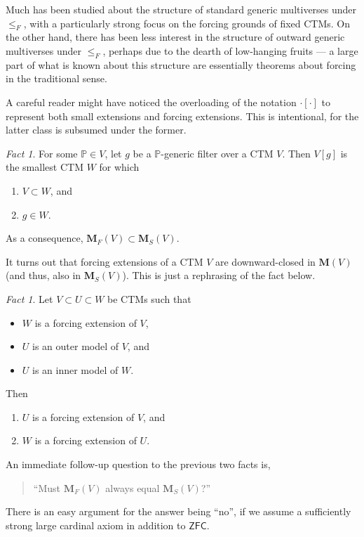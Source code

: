 \documentclass[12pt, twoside]{memoir}
\numberwithin{equation}{section}
\theoremstyle{definition}
\theoremstyle{remark}
\newtheorem{fact}[thm]{Fact}
\theoremstyle{definition}
\theoremstyle{definition}
\theoremstyle{definition}
\theoremstyle{remark}
\begin{document}
Much has been studied about the structure of standard generic multiverses under $\leq_F$, with a particularly strong focus on the forcing grounds of fixed CTMs. On the other hand, there has been less interest in the structure of outward generic multiverses under $\leq_F$, perhaps due to the dearth of low-hanging fruits --- a large part of what is known about this structure are essentially theorems about forcing in the traditional sense.

A careful reader might have noticed the overloading of the notation $\cdot [\cdot]$ to represent both small extensions and forcing extensions. This is intentional, for the latter class is subsumed under the former.

\begin{fact}
For some $\mathbb{P} \in V$, let $g$ be a $\mathbb{P}$-generic filter over a CTM $V$. Then $V[g]$ is the smallest CTM $W$ for which
\begin{enumerate}[label=(\alph*)]
    \item $V \subset W$, and
    \item $g \in W$.
\end{enumerate}
As a consequence, $\mathbf{M}_F(V) \subset \mathbf{M}_S(V)$.
\end{fact}

It turns out that forcing extensions of a CTM $V$ are downward-closed in $\mathbf{M}(V)$ (and thus, also in $\mathbf{M}_S(V)$). This is just a rephrasing of the fact below.

\begin{fact}\label{fact221}
Let $V \subset U \subset W$ be CTMs such that
\begin{itemize}
    \item $W$ is a forcing extension of $V$, 
    \item $U$ is an outer model of $V$, and
    \item $U$ is an inner model of $W$.
\end{itemize}
Then 
\begin{enumerate}[label=(\alph*)]
    \item $U$ is a forcing extension of $V$, and
    \item $W$ is a forcing extension of $U$.
\end{enumerate}
\end{fact}

An immediate follow-up question to the previous two facts is, 
\begin{quote}
    ``Must $\mathbf{M}_F(V)$ always equal $\mathbf{M}_S(V)$?''
\end{quote}
There is an easy argument for the answer being ``no'', if we assume a sufficiently strong large cardinal axiom in addition to $\mathsf{ZFC}$.
\end{document}
